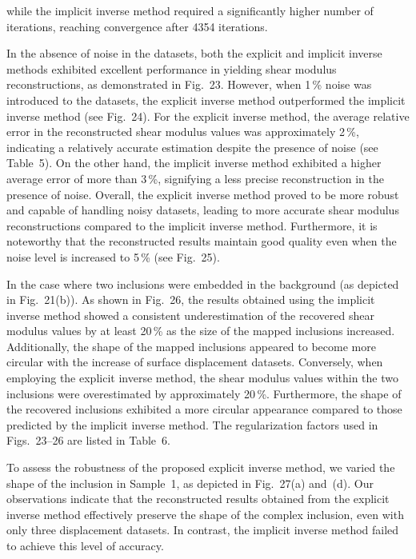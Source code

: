 \documentclass[11pt]{article}
\begin{document}
\noindent
while the implicit inverse method required a significantly higher
number of iterations, reaching convergence after 4354 iterations.

In the absence of noise in the datasets, both the explicit and
implicit inverse methods exhibited excellent performance in
yielding shear modulus reconstructions, as demonstrated in
Fig.~23. However, when 1\,\% noise was introduced to the
datasets, the explicit inverse method outperformed the implicit
inverse method (see Fig.~24). For the explicit inverse method,
the average relative error in the reconstructed shear modulus
values was approximately 2\,\%, indicating a relatively accurate
estimation despite the presence of noise (see Table~5). On the
other hand, the implicit inverse method exhibited a higher
average error of more than 3\,\%, signifying a less precise
reconstruction in the presence of noise. Overall, the explicit
inverse method proved to be more robust and capable of handling
noisy datasets, leading to more accurate shear modulus
reconstructions compared to the implicit inverse method.
Furthermore, it is noteworthy that the reconstructed results
maintain good quality even when the noise level is increased to
5\,\% (see Fig.~25).

In the case where two inclusions were embedded in the background
(as depicted in Fig.~21(b)). As shown in Fig.~26, the results
obtained using the implicit inverse method showed a consistent
underestimation of the recovered shear modulus values by at
least 20\,\% as the size of the mapped inclusions increased.
Additionally, the shape of the mapped inclusions appeared to
become more circular with the increase of surface displacement
datasets. Conversely, when employing the explicit inverse
method, the shear modulus values within the two inclusions were
overestimated by approximately 20\,\%. Furthermore, the shape
of the recovered inclusions exhibited a more circular appearance
compared to those predicted by the implicit inverse method. The
regularization factors used in Figs.~23--26 are listed in
Table~6.

To assess the robustness of the proposed explicit inverse
method, we varied the shape of the inclusion in Sample~1, as
depicted in Fig.~27(a) and~(d). Our observations indicate that
the reconstructed results obtained from the explicit inverse
method effectively preserve the shape of the complex inclusion,
even with only three displacement datasets. In contrast, the
implicit inverse method failed to achieve this level of
accuracy.
\end{document}
